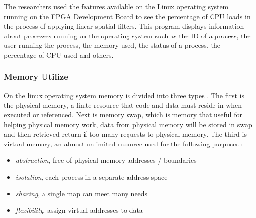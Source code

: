 The researchers used the features available on the Linux operating system running on the FPGA Development Board to see the percentage of CPU loads in the process of applying linear spatial filters. This program displays information about processes running on the operating system such as the ID of a process, the user running the process, the memory used, the status of a process, the percentage of CPU used and others.

\subsubsection{Memory Utilize}


On the linux operating system memory is divided into three types \cite{manual:linux}. The first is the physical memory, a finite resource that code and data must reside in when executed or referenced. Next is memory swap, which is memory that useful for helping physical memory work, data from physical memory will be stored in swap and then retrieved return if too many requests to physical memory. The third is virtual memory, an almost unlimited resource used for the following purposes \cite{book:os}:

\begin{itemize} [noitemsep, topsep=0pt]
    \item \textit{abstraction}, free of physical memory addresses / boundaries
    \item \textit{isolation}, each process in a separate address space 
    \item \textit{sharing}, a single map can meet many needs 
    \item \textit{flexibility}, assign virtual addresses to data
\end{itemize}

